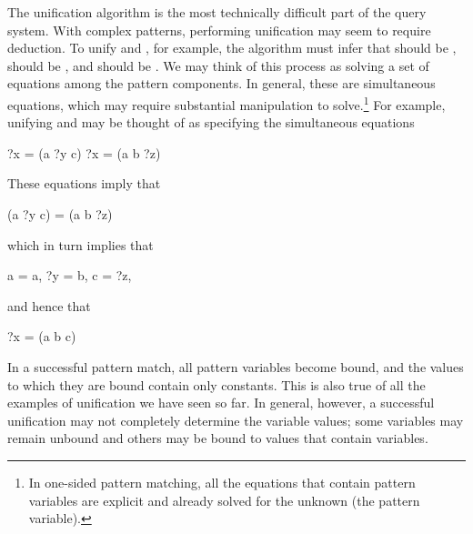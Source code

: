 The unification algorithm is the most technically difficult part of the query
system.  With complex patterns, performing unification may seem to require
deduction.  To unify  and , for
example, the algorithm must infer that  should be ,
 should be , and  should be .  We may think
of this process as solving a set of equations among the pattern components.  In
general, these are simultaneous equations, which may require substantial
manipulation to solve.\footnote{In one-sided pattern matching, all the
equations that contain pattern variables are explicit and already solved for
the unknown (the pattern variable).} For example, unifying  and
 may be thought of as specifying the simultaneous
equations

\begin{codeBlock}
?x  =  (a ?y c)
?x  =  (a b ?z)
\end{codeBlock}

\noindent
These equations imply that

\begin{codeBlock}
(a ?y c)  =  (a b ?z)
\end{codeBlock}

\noindent
which in turn implies that

\begin{codeBlock}
 a  =  a,
?y  =  b,
 c  =  ?z,
\end{codeBlock}

\noindent
and hence that

\begin{codeBlock}
?x  =  (a b c)
\end{codeBlock}

\noindent
In a successful pattern match, all pattern variables become bound, and the
values to which they are bound contain only constants.  This is also true of
all the examples of unification we have seen so far.  In general, however, a
successful unification may not completely determine the variable values; some
variables may remain unbound and others may be bound to values that contain
variables.

